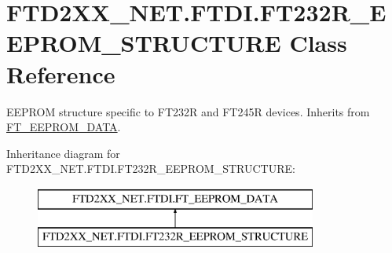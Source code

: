\hypertarget{class_f_t_d2_x_x___n_e_t_1_1_f_t_d_i_1_1_f_t232_r___e_e_p_r_o_m___s_t_r_u_c_t_u_r_e}{}\section{F\+T\+D2\+X\+X\+\_\+\+N\+E\+T.\+F\+T\+D\+I.\+F\+T232\+R\+\_\+\+E\+E\+P\+R\+O\+M\+\_\+\+S\+T\+R\+U\+C\+T\+U\+RE Class Reference}
\label{class_f_t_d2_x_x___n_e_t_1_1_f_t_d_i_1_1_f_t232_r___e_e_p_r_o_m___s_t_r_u_c_t_u_r_e}


E\+E\+P\+R\+OM structure specific to F\+T232R and F\+T245R devices. Inherits from \mbox{\hyperlink{class_f_t_d2_x_x___n_e_t_1_1_f_t_d_i_1_1_f_t___e_e_p_r_o_m___d_a_t_a}{F\+T\+\_\+\+E\+E\+P\+R\+O\+M\+\_\+\+D\+A\+TA}}.  


Inheritance diagram for F\+T\+D2\+X\+X\+\_\+\+N\+E\+T.\+F\+T\+D\+I.\+F\+T232\+R\+\_\+\+E\+E\+P\+R\+O\+M\+\_\+\+S\+T\+R\+U\+C\+T\+U\+RE\+:\begin{figure}[H]
\begin{center}
\leavevmode
\includegraphics[height=2.000000cm]{class_f_t_d2_x_x___n_e_t_1_1_f_t_d_i_1_1_f_t232_r___e_e_p_r_o_m___s_t_r_u_c_t_u_r_e}
\end{center}
\end{figure}
